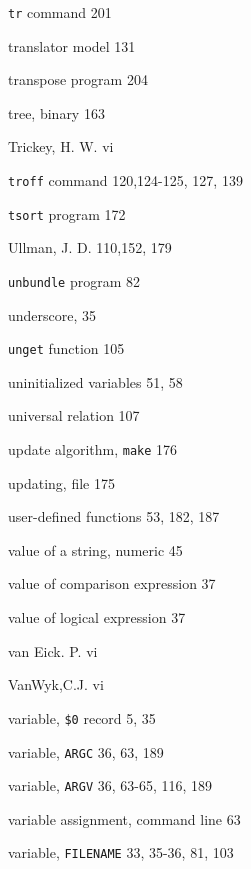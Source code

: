 \begin{multicols}{3}
\hangindent=3pc  \verb'tr' command 201

\hangindent=3pc  translator model 131

\hangindent=3pc  transpose program 204

\hangindent=3pc  tree, binary 163

\hangindent=3pc  Trickey, H. W. vi

\hangindent=3pc  \verb'troff' command 120,124-125, 127, 139

\hangindent=3pc  \verb'tsort' program 172





\hangindent=3pc  Ullman, J. D. 110,152, 179

\hangindent=3pc  \verb'unbundle' program 82

\hangindent=3pc  underscore, 35

\hangindent=3pc  \verb'unget' function 105

\hangindent=3pc  uninitialized variables 51, 58

\hangindent=3pc  universal relation 107

\hangindent=3pc  update algorithm, \verb'make' 176

\hangindent=3pc  updating, file 175

\hangindent=3pc  user-defined functions 53, 182,  187

\hangindent=3pc  value of a string, numeric 45

\hangindent=3pc  value of comparison expression 37

\hangindent=3pc  value of logical expression 37

\hangindent=3pc  van Eick. P. vi

\hangindent=3pc  VanWyk,C.J. vi

\hangindent=3pc  variable, \verb'$0' record 5, 35

\hangindent=3pc  variable, \verb'ARGC' 36, 63, 189

\hangindent=3pc  variable, \verb'ARGV' 36, 63-65, 116, 189

\hangindent=3pc  variable assignment, command line 63

\hangindent=3pc  variable, \verb'FILENAME' 33, 35-36, 81, 103


\end{multicols}
